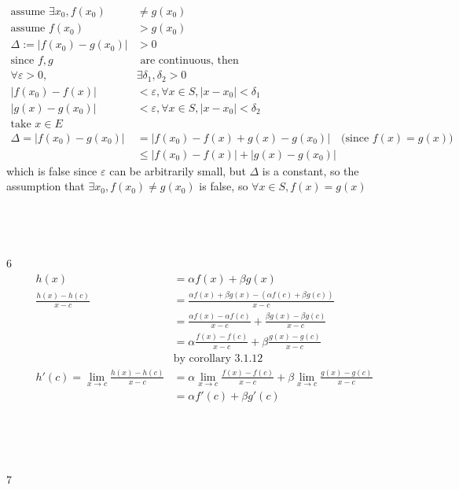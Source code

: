 \documentclass[12pt, border = 4pt, multi]{article} %
\begin{document}
\newpage
{}
\begin{align*}
\text{assume }\exists x_0, f(x_0) &\not= g(x_0)\\
\text{assume }f(x_0) &> g(x_0)\\
\Delta := |f(x_0) - g(x_0)| &> 0\\
\text{since }f, g&\text{ are continuous, then}\\
\forall \varepsilon > 0, &\exists \delta_1, \delta_2 > 0\\
|f(x_0) - f(x)| &< \varepsilon, \forall x \in S, |x - x_0| < \delta_1\\
|g(x) - g(x_0)| &< \varepsilon, \forall x \in S, |x - x_0| < \delta_2\\
\text{take } x \in E&\\
\Delta = |f(x_0) - g(x_0)| &= |f(x_0) - f(x) + g(x) - g(x_0)| \quad \text{(since } f(x) = g(x))\\
&\leq |f(x_0) - f(x)| + |g(x) - g(x_0)|
\end{align*}
which is false since $\varepsilon$ can be arbitrarily small, but $\Delta$ is a constant, so the assumption that $\exists x_0, f(x_0) \not= g(x_0)$ is false, so $\forall x \in S, f(x) = g(x)$\\
\\
\\
\\
\\
6
\begin{align*}
h(x) &= \alpha f(x) + \beta g(x)\\
\frac{h(x) - h(c)}{x - c} &= \frac{\alpha f(x) + \beta g(x) - (\alpha f(c) + \beta g(c))}{x - c}\\
&= \frac{\alpha f(x) - \alpha f(c)}{x - c} + \frac{\beta g(x) - \beta g(c)}{x - c}\\
&= \alpha\frac{f(x) - f(c)}{x - c} + \beta\frac{g(x) - g(c)}{x - c}\\
&\text{by corollary 3.1.12}\\
h'(c) = \lim_{x \rightarrow c}\frac{h(x) - h(c)}{x - c} &= \alpha\lim_{x \rightarrow c}\frac{f(x) - f(c)}{x - c} + \beta\lim_{x \rightarrow c}\frac{g(x) - g(c)}{x - c}\\
&= \alpha f'(c) + \beta g'(c)\\
\end{align*}
\\
\\
\\
\\
7
\end{document}
